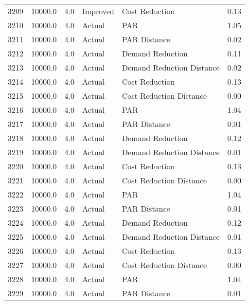 \begin{longtable}{lrrllr}
3209 &      10000.0 &     4.0 &       Improved &             Cost Reduction &   0.13 \\
3210 &      10000.0 &     4.0 &         Actual &                        PAR &   1.05 \\
3211 &      10000.0 &     4.0 &         Actual &               PAR Distance &   0.02 \\
3212 &      10000.0 &     4.0 &         Actual &           Demand Reduction &   0.11 \\
3213 &      10000.0 &     4.0 &         Actual &  Demand Reduction Distance &   0.02 \\
3214 &      10000.0 &     4.0 &         Actual &             Cost Reduction &   0.13 \\
3215 &      10000.0 &     4.0 &         Actual &    Cost Reduction Distance &   0.00 \\
3216 &      10000.0 &     4.0 &         Actual &                        PAR &   1.04 \\
3217 &      10000.0 &     4.0 &         Actual &               PAR Distance &   0.01 \\
3218 &      10000.0 &     4.0 &         Actual &           Demand Reduction &   0.12 \\
3219 &      10000.0 &     4.0 &         Actual &  Demand Reduction Distance &   0.01 \\
3220 &      10000.0 &     4.0 &         Actual &             Cost Reduction &   0.13 \\
3221 &      10000.0 &     4.0 &         Actual &    Cost Reduction Distance &   0.00 \\
3222 &      10000.0 &     4.0 &         Actual &                        PAR &   1.04 \\
3223 &      10000.0 &     4.0 &         Actual &               PAR Distance &   0.01 \\
3224 &      10000.0 &     4.0 &         Actual &           Demand Reduction &   0.12 \\
3225 &      10000.0 &     4.0 &         Actual &  Demand Reduction Distance &   0.01 \\
3226 &      10000.0 &     4.0 &         Actual &             Cost Reduction &   0.13 \\
3227 &      10000.0 &     4.0 &         Actual &    Cost Reduction Distance &   0.00 \\
3228 &      10000.0 &     4.0 &         Actual &                        PAR &   1.04 \\
3229 &      10000.0 &     4.0 &         Actual &               PAR Distance &   0.01 \\

\end{longtable}

